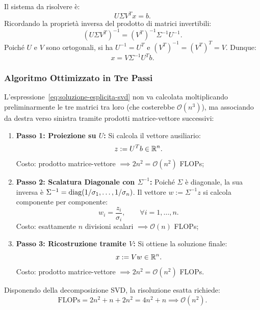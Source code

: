 Il sistema da risolvere \`e:
\begin{equation}
    U \Sigma V^T x = b.
\end{equation}
Ricordando la propriet\`a inversa del prodotto di matrici invertibili:
\begin{equation}
    (U \Sigma V^T)^{-1} = (V^T)^{-1} \Sigma^{-1} U^{-1}.
\end{equation}
Poich\'e $U$ e $V$ sono ortogonali, si ha $U^{-1} = U^T$ e $(V^T)^{-1} = (V^T)^T = V$. Dunque:
\begin{equation}
    x = V \Sigma^{-1} U^T b.
    \label{eq:soluzione-esplicita-svd}
\end{equation}

\subsubsection{Algoritmo Ottimizzato in Tre Passi}
L'espressione~\eqref{eq:soluzione-esplicita-svd} non va calcolata moltiplicando preliminarmente le tre matrici tra loro (che costerebbe $\mathcal{O}(n^3)$), ma associando da destra verso sinistra tramite prodotti matrice-vettore successivi:
\begin{enumerate}
    \item \textbf{Passo 1: Proiezione su $U$:} Si calcola il vettore ausiliario:
    \begin{equation}
        z := U^T b \in \mathbb{R}^n.
    \end{equation}
    Costo: prodotto matrice-vettore $\implies 2n^2 = \mathcal{O}(n^2)$ FLOPs;
    \item \textbf{Passo 2: Scalatura Diagonale con $\Sigma^{-1}$:} Poich\'e $\Sigma$ \`e diagonale, la sua inversa \`e $\Sigma^{-1} = \operatorname{diag}(1/\sigma_1, \dots, 1/\sigma_n)$. Il vettore $w := \Sigma^{-1} z$ si calcola componente per componente:
    \begin{equation}
        w_i = \frac{z_i}{\sigma_i}, \qquad \forall i = 1, \dots, n.
    \end{equation}
    Costo: esattamente $n$ divisioni scalari $\implies \mathcal{O}(n)$ FLOPs;
    \item \textbf{Passo 3: Ricostruzione tramite $V$:} Si ottiene la soluzione finale:
    \begin{equation}
        x := V w \in \mathbb{R}^n.
    \end{equation}
    Costo: prodotto matrice-vettore $\implies 2n^2 = \mathcal{O}(n^2)$ FLOPs.
\end{enumerate}

\begin{property}
Disponendo della decomposizione SVD, la risoluzione esatta richiede:
\begin{equation}
    \text{FLOPs} = 2n^2 + n + 2n^2 = 4n^2 + n \implies \mathcal{O}(n^2).
\end{equation}
\end{property}

